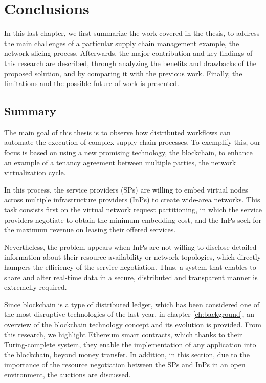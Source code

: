 \chapter{Conclusions}
\label{ch:closure}

In this last chapter, we first summarize the work covered in the thesis, to address the main challenges of a particular supply chain management example, the network slicing process. Afterwards, the major contribution and key findings of this research are described, through analyzing the benefits and drawbacks of the proposed solution, and by comparing it with the previous work. Finally, the limitations and the possible future of work is presented.

\section{Summary}

The main goal of this thesis is to observe how distributed workflows can automate the execution of complex supply chain processes. To exemplify this, our focus is based on using a new promising technology, the blockchain, to enhance an example of a tenancy agreement between multiple parties, the network virtualization cycle.

In this process, the service providers (SPs) are willing to embed virtual nodes across multiple infrastructure providers (InPs) to create wide-area networks. This task consists first on the virtual network request partitioning, in which the service providers negotiate to obtain the minimum embedding cost, and the InPs seek for the maximum revenue on leasing their offered services.

Nevertheless, the problem appears when InPs are not willing to disclose detailed information about their resource availability or network topologies, which directly hampers the efficiency of the service negotiation. Thus, a system that enables to share and alter real-time data in a secure, distributed and transparent manner is extremelly required.

Since blockchain is a type of distributed ledger, which has been considered one of the most disruptive technologies of the last year, in chapter \ref{ch:background}, an overview of the blockchain technology concept and its evolution is provided. From this research, we highlight Ethereum smart contracts, which thanks to their Turing-complete system, they enable the implementation of any application into the blockchain, beyond money transfer. In addition, in this section, due to the importance of the resource negotiation between the SPs and InPs in an open environment, the auctions are discussed.

